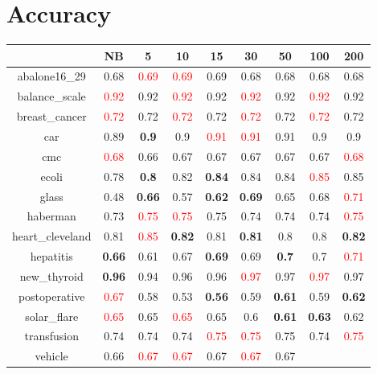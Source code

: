 \documentclass{article}%
\begin{document}
%
\normalsize%
\section*{Accuracy}%
\begin{tabular}{c|cccccccc}%
\hline%
&NB&5&10&15&30&50&100&200\\%
\hline%
abalone16\_29&0.68&\textcolor{red}{ 
0.69
}&\textcolor{red}{ 
0.69
}&0.69&0.68&0.68&0.68&0.68\\%
\hline%
balance\_scale&\textcolor{red}{ 
0.92
}&0.92&\textcolor{red}{ 
0.92
}&0.92&\textcolor{red}{ 
0.92
}&0.92&\textcolor{red}{ 
0.92
}&0.92\\%
\hline%
breast\_cancer&\textcolor{red}{ 
0.72
}&0.72&\textcolor{red}{ 
0.72
}&0.72&\textcolor{red}{ 
0.72
}&0.72&\textcolor{red}{ 
0.72
}&0.72\\%
\hline%
car&0.89&\textbf{0.9}&0.9&\textcolor{red}{ 
0.91
}&\textcolor{red}{ 
0.91
}&0.91&0.9&0.9\\%
\hline%
cmc&\textcolor{red}{ 
0.68
}&0.66&0.67&0.67&0.67&0.67&0.67&\textcolor{red}{ 
0.68
}\\%
\hline%
ecoli&0.78&\textbf{0.8}&0.82&\textbf{0.84}&0.84&0.84&\textcolor{red}{ 
0.85
}&0.85\\%
\hline%
glass&0.48&\textbf{0.66}&0.57&\textbf{0.62}&\textbf{0.69}&0.65&0.68&\textcolor{red}{ 
0.71
}\\%
\hline%
haberman&0.73&\textcolor{red}{ 
0.75
}&\textcolor{red}{ 
0.75
}&0.75&0.74&0.74&0.74&\textcolor{red}{ 
0.75
}\\%
\hline%
heart\_cleveland&0.81&\textcolor{red}{ 
0.85
}&\textbf{0.82}&0.81&\textbf{0.81}&0.8&0.8&\textbf{0.82}\\%
\hline%
hepatitis&\textbf{0.66}&0.61&0.67&\textbf{0.69}&0.69&\textbf{0.7}&0.7&\textcolor{red}{ 
0.71
}\\%
\hline%
new\_thyroid&\textbf{0.96}&0.94&0.96&0.96&\textcolor{red}{ 
0.97
}&0.97&\textcolor{red}{ 
0.97
}&0.97\\%
\hline%
postoperative&\textcolor{red}{ 
0.67
}&0.58&0.53&\textbf{0.56}&0.59&\textbf{0.61}&0.59&\textbf{0.62}\\%
\hline%
solar\_flare&\textcolor{red}{ 
0.65
}&0.65&\textcolor{red}{ 
0.65
}&0.65&0.6&\textbf{0.61}&\textbf{0.63}&0.62\\%
\hline%
transfusion&0.74&0.74&0.74&\textcolor{red}{ 
0.75
}&\textcolor{red}{ 
0.75
}&0.75&0.74&\textcolor{red}{ 
0.75
}\\%
\hline%
vehicle&0.66&\textcolor{red}{ 
0.67
}&\textcolor{red}{ 
0.67
}&0.67&\textcolor{red}{ 
0.67
}&0.67&\textcolor{red}{ 
}
\end{tabular}
\end{document}
